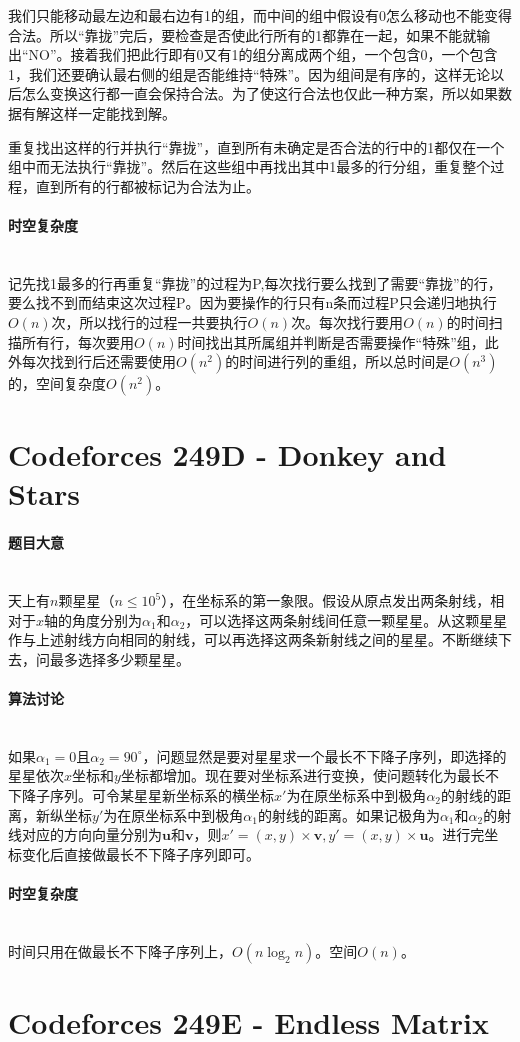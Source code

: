 \documentclass[UTF8]{ctexart}
\newcommand{\myparagraph}[1]{\paragraph{#1}\mbox{}\\}
\theoremstyle{nonumberplain}
\begin{document}
			我们只能移动最左边和最右边有1的组，而中间的组中假设有0怎么移动也不能变得合法。所以“靠拢”完后，要检查是否使此行所有的1都靠在一起，如果不能就输出“NO”。接着我们把此行即有0又有1的组分离成两个组，一个包含0，一个包含1，我们还要确认最右侧的组是否能维持“特殊”。因为组间是有序的，这样无论以后怎么变换这行都一直会保持合法。为了使这行合法也仅此一种方案，所以如果数据有解这样一定能找到解。
		
			重复找出这样的行并执行“靠拢”，直到所有未确定是否合法的行中的1都仅在一个组中而无法执行“靠拢”。然后在这些组中再找出其中1最多的行分组，重复整个过程，直到所有的行都被标记为合法为止。
		
		\myparagraph{时空复杂度}
		
			记先找1最多的行再重复“靠拢”的过程为P,每次找行要么找到了需要“靠拢”的行，要么找不到而结束这次过程P。因为要操作的行只有n条而过程P只会递归地执行$O(n)$次，所以找行的过程一共要执行$O(n)$次。每次找行要用$O(n)$的时间扫描所有行，每次要用$O(n)$时间找出其所属组并判断是否需要操作“特殊”组，此外每次找到行后还需要使用$O(n^2)$的时间进行列的重组，所以总时间是$O(n^3)$的，空间复杂度$O(n^2)$。
	
	\section{Codeforces 249D - Donkey and Stars}
	
		\myparagraph{题目大意}
		
			天上有$n$颗星星（$n \leq 10^5$），在坐标系的第一象限。假设从原点发出两条射线，相对于$x$轴的角度分别为$\alpha_1$和$\alpha_2$，可以选择这两条射线间任意一颗星星。从这颗星星作与上述射线方向相同的射线，可以再选择这两条新射线之间的星星。不断继续下去，问最多选择多少颗星星。
		
		\myparagraph{算法讨论}
		
			如果$\alpha_1=0$且$\alpha_2=90^\circ$，问题显然是要对星星求一个最长不下降子序列，即选择的星星依次$x$坐标和$y$坐标都增加。现在要对坐标系进行变换，使问题转化为最长不下降子序列。可令某星星新坐标系的横坐标$x'$为在原坐标系中到极角$\alpha_2$的射线的距离，新纵坐标$y'$为在原坐标系中到极角$\alpha_1$的射线的距离。如果记极角为$\alpha_1$和$\alpha_2$的射线对应的方向向量分别为$\boldsymbol{u}$和$\boldsymbol{v}$，则$x'=(x,y)\times \boldsymbol{v}, y'=(x,y)\times \boldsymbol{u}$。进行完坐标变化后直接做最长不下降子序列即可。
		
		\myparagraph{时空复杂度}
		
			时间只用在做最长不下降子序列上，$O(n\log_2n)$。空间$O(n)$。
	
	\section{Codeforces 249E - Endless Matrix}
	
\end{document}
